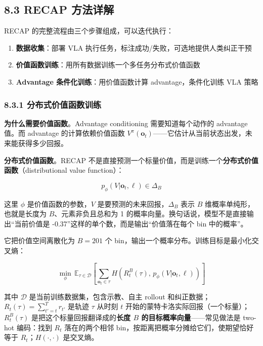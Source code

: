 \documentclass[
  chinese,
]{ctexart}
\providecommand{\tightlist}{%
  \setlength{\itemsep}{0pt}\setlength{\parskip}{0pt}}
\begin{document}
\subsection{8.3 RECAP 方法详解}\label{recap-ux65b9ux6cd5ux8be6ux89e3}

RECAP 的完整流程由三个步骤组成，可以迭代执行：

\begin{enumerate}
\def\labelenumi{\arabic{enumi}.}
\tightlist
\item
  \textbf{数据收集}：部署 VLA
  执行任务，标注成功/失败，可选地提供人类纠正干预
\item
  \textbf{价值函数训练}：用所有数据训练一个多任务分布式价值函数
\item
  \textbf{Advantage 条件化训练}：用价值函数计算 advantage，条件化训练
  VLA 策略
\end{enumerate}

\subsubsection{8.3.1
分布式价值函数训练}\label{ux5206ux5e03ux5f0fux4ef7ux503cux51fdux6570ux8badux7ec3}

\textbf{为什么需要价值函数}。Advantage conditioning 需要知道每个动作的
advantage 值。而 advantage 的计算依赖价值函数
\(V^\pi(\mathbf{o}_t)\)------它估计从当前状态出发，未来能获得多少回报。

\textbf{分布式价值函数}。RECAP
不是直接预测一个标量价值，而是训练一个\textbf{分布式价值函数}（distributional
value function）：

\[
p_\phi(V | \mathbf{o}_t, \ell) \in \Delta_B
\]

这里 \(\phi\) 是价值函数的参数，\(V\) 是要预测的未来回报，\(\Delta_B\)
表示 \(B\) 维概率单纯形，也就是长度为 \(B\)、元素非负且总和为 1
的概率向量。换句话说，模型不是直接输出``当前价值是
-0.37''这样的单个数，而是输出``价值落在每个 bin 中的概率''。

它把价值空间离散化为 \(B = 201\) 个
bin，输出一个概率分布。训练目标是最小化交叉熵：

\[
\min_\phi \, \mathbb{E}_{\tau \in \mathcal{D}}\left[\sum_{\mathbf{o}_t \in \tau} H\!\left(R^B_t(\tau), \, p_\phi(V | \mathbf{o}_t, \ell)\right)\right]
\]

其中 \(\mathcal{D}\) 是当前训练数据集，包含示教、自主 rollout
和纠正数据；\(R_t(\tau)=\sum_{t'=t}^T r_{t'}\) 是轨迹 \(\tau\) 从时刻
\(t\) 开始的蒙特卡洛实际回报（一个标量）；\(R^B_t(\tau)\)
是把这个标量回报翻译成的\textbf{长度 \(B\)
的目标概率向量}------常见做法是 two-hot 编码：找到 \(R_t\)
落在的两个相邻 bin，按距离把概率分摊给它们，使期望恰好等于
\(R_t\)；\(H(\cdot,\cdot)\) 是交叉熵。
\end{document}
